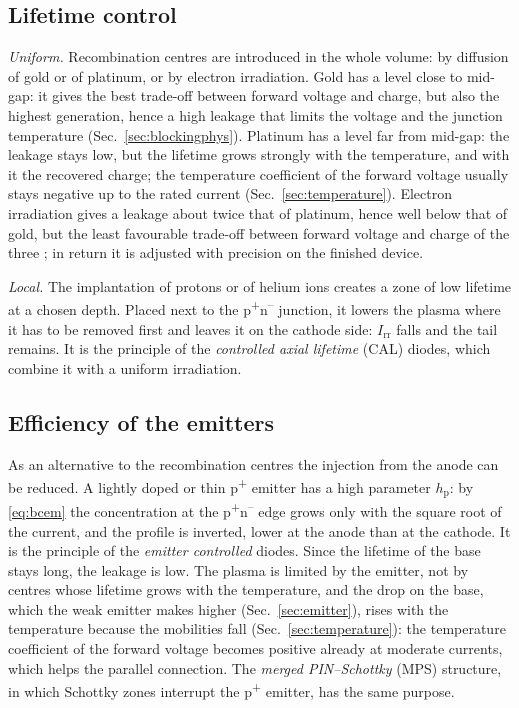 \documentclass[10pt,a4paper]{scrartcl}
\newcommand{\Irr}{I_\mathrm{rr}}
\newcommand{\Pp}{p\textsuperscript{+}}
\newcommand{\Nm}{n\textsuperscript{--}}
\begin{document}
\subsection{Lifetime control}
\label{sec:lifetimecontrol}
\emph{Uniform.} Recombination centres are introduced in the whole volume: by diffusion of gold or of platinum, or by electron irradiation. Gold has a level close to mid-gap: it gives the best trade-off between forward voltage and charge, but also the highest generation, hence a high leakage that limits the voltage and the junction temperature (Sec.~\ref{sec:blockingphys}). Platinum has a level far from mid-gap: the leakage stays low, but the lifetime grows strongly with the temperature, and with it the recovered charge; the temperature coefficient of the forward voltage usually stays negative up to the rated current (Sec.~\ref{sec:temperature}). Electron irradiation gives a leakage about twice that of platinum, hence well below that of gold, but the least favourable trade-off between forward voltage and charge of the three \cite{baligasun1977}; in return it is adjusted with precision on the finished device.

\emph{Local.} The implantation of protons or of helium ions creates a zone of low lifetime at a chosen depth. Placed next to the \Pp\Nm{} junction, it lowers the plasma where it has to be removed first and leaves it on the cathode side: $\Irr$ falls and the tail remains. It is the principle of the \emph{controlled axial lifetime} (CAL) diodes, which combine it with a uniform irradiation.

\subsection{Efficiency of the emitters}
\label{sec:emittereff}
As an alternative to the recombination centres the injection from the anode can be reduced. A lightly doped or thin \Pp{} emitter has a high parameter $h_\mathrm{p}$: by \eqref{eq:bcem} the concentration at the \Pp\Nm{} edge grows only with the square root of the current, and the profile is inverted, lower at the anode than at the cathode. It is the principle of the \emph{emitter controlled} diodes. Since the lifetime of the base stays long, the leakage is low. The plasma is limited by the emitter, not by centres whose lifetime grows with the temperature, and the drop on the base, which the weak emitter makes higher (Sec.~\ref{sec:emitter}), rises with the temperature because the mobilities fall (Sec.~\ref{sec:temperature}): the temperature coefficient of the forward voltage becomes positive already at moderate currents, which helps the parallel connection. The \emph{merged PIN--Schottky} (MPS) structure, in which Schottky zones interrupt the \Pp{} emitter, has the same purpose.
\end{document}

